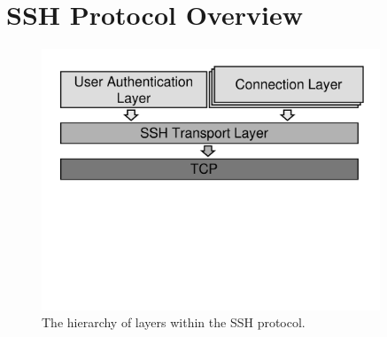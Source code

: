 \section{SSH Protocol Overview}
\label{sec:overview}

\begin{figure}[t]
  \centering

  \includegraphics[width=0.9\textwidth,keepaspectratio=true]{sshlayer}
  \vspace{-13.5em}

  \caption{The hierarchy of layers within the SSH protocol.}
  \label{fig:ssh}
  \vspace{-1.5em}
\end{figure}

